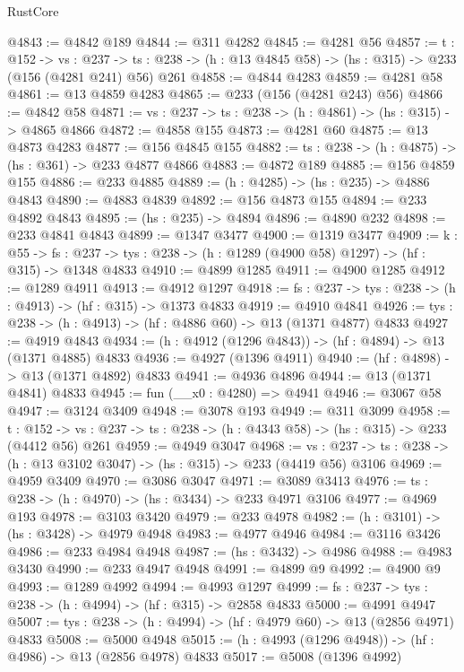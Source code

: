 \begin{lexlean}{RustCore}
\begin{coremodule}
@4843 := @4842 @189
@4844 := @311 @4282
@4845 := @4281 @56
@4857 := {t : @152} ->
  {vs : @237} ->
  {ts : @238} -> (h : @13 @4845 @58) -> (hs : @315) -> @233 (@156 (@4281 @241) @56) @261
@4858 := @4844 @4283
@4859 := @4281 @58
@4861 := @13 @4859 @4283
@4865 := @233 (@156 (@4281 @243) @56)
@4866 := @4842 @58
@4871 := {vs : @237} -> {ts : @238} -> (h : @4861) -> (hs : @315) -> @4865 @4866
@4872 := @4858 @155
@4873 := @4281 @60
@4875 := @13 @4873 @4283
@4877 := @156 @4845 @155
@4882 := {ts : @238} -> (h : @4875) -> (hs : @361) -> @233 @4877 @4866
@4883 := @4872 @189
@4885 := @156 @4859 @155
@4886 := @233 @4885
@4889 := (h : @4285) -> (hs : @235) -> @4886 @4843
@4890 := @4883 @4839
@4892 := @156 @4873 @155
@4894 := @233 @4892 @4843
@4895 := (hs : @235) -> @4894
@4896 := @4890 @232
@4898 := @233 @4841 @4843
@4899 := @1347 @3477
@4900 := @1319 @3477
@4909 := {k : @55} ->
  {fs : @237} -> {tys : @238} -> (h : @1289 (@4900 @58) @1297) -> (hf : @315) -> @1348 @4833
@4910 := @4899 @1285
@4911 := @4900 @1285
@4912 := @1289 @4911
@4913 := @4912 @1297
@4918 := {fs : @237} -> {tys : @238} -> (h : @4913) -> (hf : @315) -> @1373 @4833
@4919 := @4910 @4841
@4926 := {tys : @238} -> (h : @4913) -> (hf : @4886 @60) -> @13 (@1371 @4877) @4833
@4927 := @4919 @4843
@4934 := (h : @4912 (@1296 @4843)) -> (hf : @4894) -> @13 (@1371 @4885) @4833
@4936 := @4927 (@1396 @4911)
@4940 := (hf : @4898) -> @13 (@1371 @4892) @4833
@4941 := @4936 @4896
@4944 := @13 (@1371 @4841) @4833
@4945 := fun (__x0 : @4280) => @4941
@4946 := @3067 @58
@4947 := @3124 @3409
@4948 := @3078 @193
@4949 := @311 @3099
@4958 := {t : @152} ->
  {vs : @237} -> {ts : @238} -> (h : @4343 @58) -> (hs : @315) -> @233 (@4412 @56) @261
@4959 := @4949 @3047
@4968 := {vs : @237} ->
  {ts : @238} -> (h : @13 @3102 @3047) -> (hs : @315) -> @233 (@4419 @56) @3106
@4969 := @4959 @3409
@4970 := @3086 @3047
@4971 := @3089 @3413
@4976 := {ts : @238} -> (h : @4970) -> (hs : @3434) -> @233 @4971 @3106
@4977 := @4969 @193
@4978 := @3103 @3420
@4979 := @233 @4978
@4982 := (h : @3101) -> (hs : @3428) -> @4979 @4948
@4983 := @4977 @4946
@4984 := @3116 @3426
@4986 := @233 @4984 @4948
@4987 := (hs : @3432) -> @4986
@4988 := @4983 @3430
@4990 := @233 @4947 @4948
@4991 := @4899 @9
@4992 := @4900 @9
@4993 := @1289 @4992
@4994 := @4993 @1297
@4999 := {fs : @237} -> {tys : @238} -> (h : @4994) -> (hf : @315) -> @2858 @4833
@5000 := @4991 @4947
@5007 := {tys : @238} -> (h : @4994) -> (hf : @4979 @60) -> @13 (@2856 @4971) @4833
@5008 := @5000 @4948
@5015 := (h : @4993 (@1296 @4948)) -> (hf : @4986) -> @13 (@2856 @4978) @4833
@5017 := @5008 (@1396 @4992)

\end{coremodule}
\end{lexlean}
